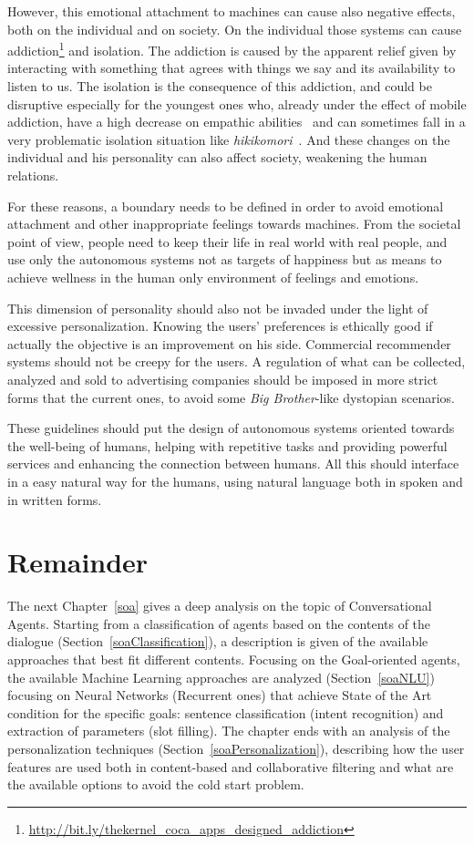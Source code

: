 However, this emotional attachment to machines can cause also negative effects, both on the individual and on society. On the individual those systems can cause addiction\footnote{\url{http://bit.ly/thekernel_coca_apps_designed_addiction}} and isolation. The addiction is caused by the apparent relief given by interacting with something that agrees with things we say and its availability to listen to us. The isolation is the consequence of this addiction, and could be disruptive especially for the youngest ones who, already under the effect of mobile addiction, have a high decrease on empathic abilities~\cite{konrath2011changes} and can sometimes fall in a very problematic isolation situation like \textit{hikikomori}~\cite{furlong2008japanese}. And these changes on the individual and his personality can also affect society, weakening the human relations.

For these reasons, a boundary needs to be defined in order to avoid emotional attachment and other inappropriate feelings towards machines. From the societal point of view, people need to keep their life in real world with real people, and use only the autonomous systems not as targets of happiness but as means to achieve wellness in the human only environment of feelings and emotions.

This dimension of personality should also not be invaded under the light of excessive personalization. Knowing the users' preferences is ethically good if actually the objective is an improvement on his side. Commercial recommender systems should not be creepy for the users. A regulation of what can be collected, analyzed and sold to advertising companies should be imposed in more strict forms that the current ones, to avoid some \textit{Big Brother}-like dystopian scenarios.

These guidelines should put the design of autonomous systems oriented towards the well-being of humans, helping with repetitive tasks and providing powerful services and enhancing the connection between humans. All this should interface in a easy natural way for the humans, using natural language both in spoken and in written forms.

\section{Remainder}
The next Chapter~\ref{soa} gives a deep analysis on the topic of Conversational Agents. Starting from a classification of agents based on the contents of the dialogue (Section~\ref{soaClassification}), a description is given of the available approaches that best fit different contents. Focusing on the Goal-oriented agents, the available Machine Learning approaches are analyzed (Section~\ref{soaNLU}) focusing on Neural Networks (Recurrent ones) that achieve State of the Art condition for the specific goals: sentence classification (intent recognition) and extraction of parameters (slot filling). The chapter ends with an analysis of the personalization techniques (Section~\ref{soaPersonalization}), describing how the user features are used both in content-based and collaborative filtering and what are the available options to avoid the cold start problem.

